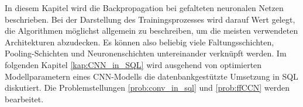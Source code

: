 In diesem Kapitel wird die Backpropagation bei gefalteten neuronalen Netzen beschrieben. Bei der Darstellung des Trainingsprozesses wird darauf Wert gelegt, die Algorithmen möglichst allgemein zu beschreiben, um
die meisten verwendeten Architekturen abzudecken. Es können also beliebig viele Faltungsschichten, Pooling-Schichten und Neuronenschichten untereinander verknüpft werden. Im folgenden Kapitel \ref{kap:CNN_in_SQL} wird ausgehend von optimierten Modellparametern eines CNN-Modells die datenbankgestützte Umsetzung in SQL diskutiert. Die Problemstellungen \ref{prob:conv_in_sql} und \ref{prob:ffCCN} werden bearbeitet. 





